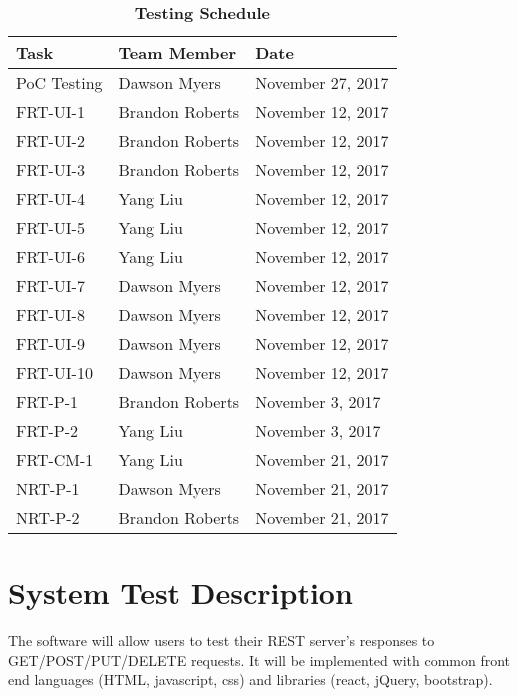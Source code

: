 \begin{table}[!htbp]
	\begin{tabularx}{\textwidth}{X  X  X }
		\toprule
		\textbf{Task} & \textbf{Team Member} & Date\\
		\midrule

		PoC Testing & Dawson Myers & November 27, 2017 \\
		FRT-UI-1 & Brandon Roberts & November 12, 2017 \\
		FRT-UI-2 & Brandon Roberts & November 12, 2017 \\
		FRT-UI-3 & Brandon Roberts & November 12, 2017 \\
		FRT-UI-4 & Yang Liu & November 12, 2017 \\
		FRT-UI-5 & Yang Liu & November 12, 2017 \\
		FRT-UI-6 & Yang Liu & November 12, 2017 \\
		FRT-UI-7 & Dawson Myers & November 12, 2017 \\
		FRT-UI-8 & Dawson Myers & November 12, 2017 \\
		FRT-UI-9 & Dawson Myers & November 12, 2017 \\
		FRT-UI-10 & Dawson Myers & November 12, 2017 \\
		FRT-P-1 & Brandon Roberts & November 3, 2017 \\
		FRT-P-2 & Yang Liu & November 3, 2017 \\
		FRT-CM-1 & Yang Liu & November 21, 2017 \\
		NRT-P-1 & Dawson Myers & November 21, 2017 \\
		NRT-P-2 & Brandon Roberts & November 21, 2017 \\
		
		\bottomrule
	\end{tabularx}
	\caption{\textbf{Testing Schedule}} \label{Table:sched}
\end{table}

\section{System Test Description}
The software will allow users to test their REST server’s responses to GET/POST/PUT/DELETE requests. It will be implemented with common front end languages (HTML, javascript, css) and libraries (react, jQuery, bootstrap).

